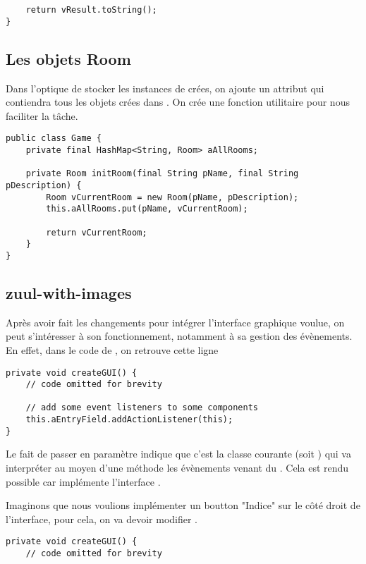 \begin{exercise}[subtitle=getCommandList]
\begin{verbatim}
    return vResult.toString();
}
\end{verbatim}

\subsection*{Les objets Room}

Dans l'optique de stocker les instances de  crées, on ajoute un attribut  qui contiendra tous les objets crées dans . On crée une fonction utilitaire  pour nous faciliter la tâche.

\begin{verbatim}
public class Game {
    private final HashMap<String, Room> aAllRooms;

    private Room initRoom(final String pName, final String pDescription) {
        Room vCurrentRoom = new Room(pName, pDescription);
        this.aAllRooms.put(pName, vCurrentRoom);

        return vCurrentRoom;
    }
}
\end{verbatim}

\subsection*{zuul-with-images}

Après avoir fait les changements pour intégrer l'interface graphique voulue, on peut s'intéresser à son fonctionnement, notamment à sa gestion des évènements. En effet, dans le code de , on retrouve cette ligne

\begin{verbatim}
private void createGUI() {
    // code omitted for brevity
    
    // add some event listeners to some components
    this.aEntryField.addActionListener(this);
}
\end{verbatim}

Le fait de passer  en paramètre indique que c'est la classe courante (soit ) qui va interpréter au moyen d'une méthode  les évènements venant du . Cela est rendu possible car  implémente l'interface .

Imaginons que nous voulions implémenter un boutton "Indice" sur le côté droit de l'interface, pour cela, on va devoir modifier .

\begin{verbatim}
private void createGUI() {
    // code omitted for brevity
    

\end{verbatim}
\end{exercise}
